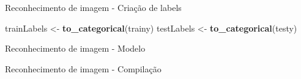 \documentclass[
  ignorenonframetext,
]{beamer}
\newenvironment{Shaded}{\begin{snugshade}}{\end{snugshade}}
\newcommand{\DataTypeTok}[1]{\textcolor[rgb]{0.13,0.29,0.53}{#1}}
\newcommand{\DecValTok}[1]{\textcolor[rgb]{0.00,0.00,0.81}{#1}}
\newcommand{\KeywordTok}[1]{\textcolor[rgb]{0.13,0.29,0.53}{\textbf{#1}}}
\newcommand{\NormalTok}[1]{#1}
\newcommand{\OperatorTok}[1]{\textcolor[rgb]{0.81,0.36,0.00}{\textbf{#1}}}
\newcommand{\StringTok}[1]{\textcolor[rgb]{0.31,0.60,0.02}{#1}}
\begin{document}
\begin{frame}[fragile]{Reconhecimento de imagem - Criação de labels}
\protect\hypertarget{reconhecimento-de-imagem---criauxe7uxe3o-de-labels}{}

\begin{Shaded}
\begin{Highlighting}[]
\NormalTok{trainLabels <-}\StringTok{ }\KeywordTok{to_categorical}\NormalTok{(trainy)}
\NormalTok{testLabels <-}\StringTok{ }\KeywordTok{to_categorical}\NormalTok{(testy)}
\end{Highlighting}
\end{Shaded}

\end{frame}

\begin{frame}[fragile]{Reconhecimento de imagem - Modelo}
\protect\hypertarget{reconhecimento-de-imagem---modelo}{}

\begin{Shaded}
\end{Shaded}

\end{frame}

\begin{frame}[fragile]{Reconhecimento de imagem - Compilação}
\protect\hypertarget{reconhecimento-de-imagem---compilauxe7uxe3o}{}

\begin{Shaded}
\end{Shaded}

\end{frame}
\end{document}
